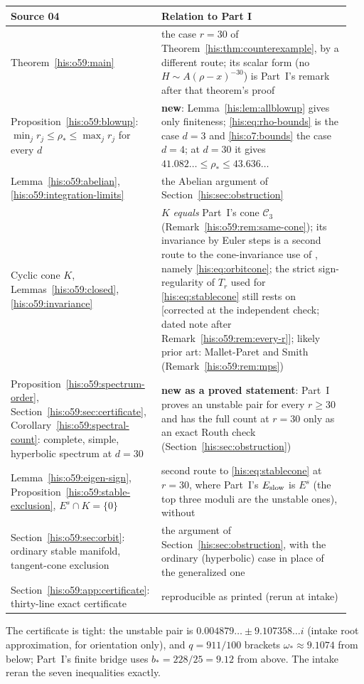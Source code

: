 \documentclass[11pt]{article}
\theoremstyle{remark}\newtheorem{remark}[theorem]{Remark}
\numberwithin{equation}{section}
\begin{document}
\begin{center}\small
\begin{tabular}{@{}>{\raggedright\arraybackslash}p{0.40\linewidth}>{\raggedright\arraybackslash}p{0.55\linewidth}@{}}
\toprule
Source 04 & Relation to Part I\\
\midrule
Theorem~\ref{his:o59:main} & the case $r=30$ of Theorem~\ref{his:thm:counterexample}, by a different route; its scalar form (no $H\sim A(\rho-x)^{-30}$) is Part~I's remark after that theorem's proof\\
Proposition~\ref{his:o59:blowup}: $\min_jr_j\le\rho_*\le\max_jr_j$ for every $d$ & \textbf{new}: Lemma~\ref{his:lem:allblowup} gives only finiteness; \eqref{his:eq:rho-bounds} is the case $d=3$ and \eqref{his:o7:bounds} the case $d=4$; at $d=30$ it gives $41.082\ldots\le\rho_*\le43.636\ldots$\\
Lemma~\ref{his:o59:abelian}, \eqref{his:o59:integration-limits} & the Abelian argument of Section~\ref{his:sec:obstruction}\\
Cyclic cone $K$, Lemmas~\ref{his:o59:closed}, \ref{his:o59:invariance} & $K$ \emph{equals} Part~I's cone $\mathcal C_3$ (Remark~\ref{his:o59:rem:same-cone}); its invariance by Euler steps is a second route to the cone-invariance use of \cite{weiss2021}, namely \eqref{his:eq:orbitcone}; the strict sign-regularity of $T_r$ used for \eqref{his:eq:stablecone} still rests on \cite{weiss2021} \textup{[}corrected at the independent check; dated note after Remark~\ref{his:o59:rem:every-r}\textup{]}; likely prior art: Mallet-Paret and Smith (Remark~\ref{his:o59:rem:mps})\\
Proposition~\ref{his:o59:spectrum-order}, Section~\ref{his:o59:sec:certificate}, Corollary~\ref{his:o59:spectral-count}: complete, simple, hyperbolic spectrum at $d=30$ & \textbf{new as a proved statement}: Part~I proves an unstable pair for every $r\ge30$ and has the full count at $r=30$ only as an exact Routh check (Section~\ref{his:sec:obstruction})\\
Lemma~\ref{his:o59:eigen-sign}, Proposition~\ref{his:o59:stable-exclusion}, $E^s\cap K=\{0\}$ & second route to \eqref{his:eq:stablecone} at $r=30$, where Part~I's $E_{\rm slow}$ is $E^s$ (the top three moduli are the unstable ones), without \cite{alseidi2019}\\
Section~\ref{his:o59:sec:orbit}: ordinary stable manifold, tangent-cone exclusion & the argument of Section~\ref{his:sec:obstruction}, with the ordinary (hyperbolic) case \cite[Theorem~7.3.1(1),(4)]{lanford1997} in place of the generalized one\\
Section~\ref{his:o59:app:certificate}: thirty-line exact certificate & reproducible as printed (rerun at intake)\\
\bottomrule
\end{tabular}
\end{center}
The certificate is tight: the unstable pair is $0.004879\ldots\pm9.107358\ldots i$ (intake root approximation, for orientation only), and $q=911/100$ brackets $\omega_*\approx9.1074$ from below; Part~I's finite bridge uses $b_*=228/25=9.12$ from above. The intake reran the seven inequalities exactly.
\end{document}
